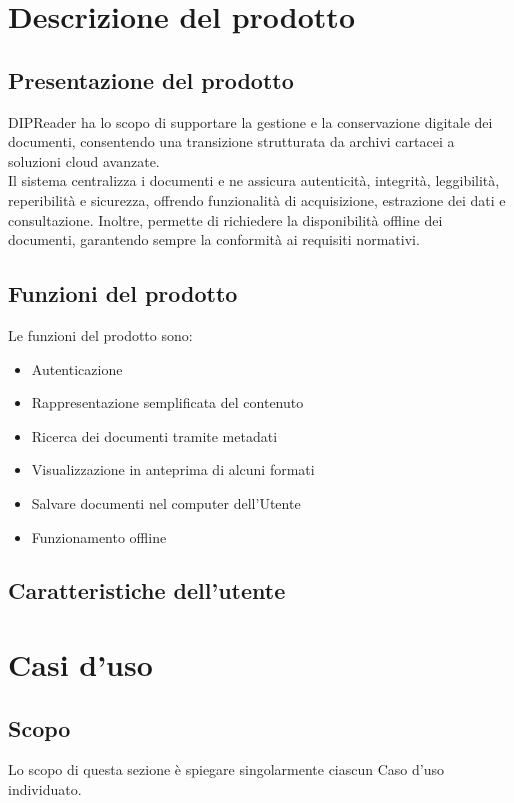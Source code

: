 \documentclass[a4paper,12pt]{article}
\begin{document}
    \section{Descrizione del prodotto} {
        \subsection{Presentazione del prodotto}
            DIPReader ha lo scopo di supportare la gestione e la conservazione digitale dei documenti, consentendo una transizione strutturata da archivi cartacei a soluzioni cloud avanzate.
            \\Il sistema centralizza i documenti e ne assicura autenticità, integrità, leggibilità, reperibilità e sicurezza, offrendo funzionalità di acquisizione, estrazione dei dati e consultazione. Inoltre, permette di richiedere la disponibilità offline dei documenti, garantendo sempre la conformità ai requisiti normativi. 
        \subsection{Funzioni del prodotto}
        Le funzioni del prodotto sono: 
        \begin{itemize}
            \item Autenticazione
            \item Rappresentazione semplificata del contenuto 
            \item Ricerca dei documenti tramite metadati
            \item Visualizzazione in anteprima di alcuni formati
            \item Salvare documenti nel computer dell'Utente
            \item Funzionamento offline
        \end{itemize}
        \subsection{Caratteristiche dell'utente}

    }

    \section{Casi d'uso}
        \subsection{Scopo}
            Lo scopo di questa sezione è spiegare singolarmente ciascun Caso d'uso individuato.  
\end{document}
